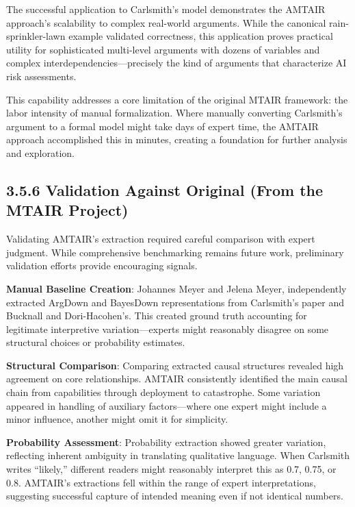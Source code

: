 \documentclass[
  11pt,
  letterpaper,
  openany]{book}
\begin{document}
\begin{landscape}
The successful application to Carlsmith's model demonstrates the AMTAIR
approach's scalability to complex real-world arguments. While the
canonical rain-sprinkler-lawn example validated correctness, this
application proves practical utility for sophisticated multi-level
arguments with dozens of variables and complex
interdependencies---precisely the kind of arguments that characterize AI
risk assessments.

This capability addresses a core limitation of the original MTAIR
framework: the labor intensity of manual formalization. Where manually
converting Carlsmith's argument to a formal model might take days of
expert time, the AMTAIR approach accomplished this in minutes, creating
a foundation for further analysis and exploration.

\end{landscape}

\subsection{3.5.6 Validation Against Original (From the MTAIR
Project)}\label{sec-carlsmith-validation}

Validating AMTAIR's extraction required careful comparison with expert
judgment. While comprehensive benchmarking remains future work,
preliminary validation efforts provide encouraging signals.

\textbf{Manual Baseline Creation}: Johannes Meyer and Jelena Meyer,
independently extracted ArgDown and BayesDown representations from
Carlsmith's paper and Bucknall and Dori-Hacohen's. This created ground
truth accounting for legitimate interpretive variation---experts might
reasonably disagree on some structural choices or probability estimates.

\textbf{Structural Comparison}: Comparing extracted causal structures
revealed high agreement on core relationships. AMTAIR consistently
identified the main causal chain from capabilities through deployment to
catastrophe. Some variation appeared in handling of auxiliary
factors---where one expert might include a minor influence, another
might omit it for simplicity.

\textbf{Probability Assessment}: Probability extraction showed greater
variation, reflecting inherent ambiguity in translating qualitative
language. When Carlsmith writes ``likely,'' different readers might
reasonably interpret this as 0.7, 0.75, or 0.8. AMTAIR's extractions
fell within the range of expert interpretations, suggesting successful
capture of intended meaning even if not identical numbers.
\end{document}
